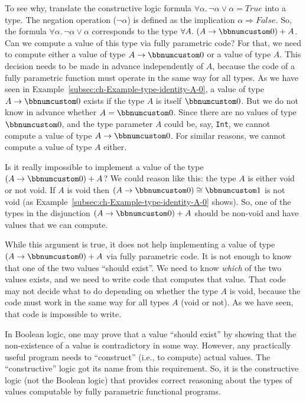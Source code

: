 To see why, translate the constructive logic formula $\forall\alpha.\,\neg\alpha\vee\alpha=True$
into a type. The negation operation ($\neg\alpha$) is defined as
the implication $\alpha\Rightarrow False$. So, the formula $\forall\alpha.\,\neg\alpha\vee\alpha$
corresponds to the type $\forall A.\,\left(A\rightarrow\bbnum 0\right)+A$.
Can we compute a value of this type via fully parametric code? For
that, we need to compute either a value of type $A\rightarrow\bbnum 0$
or a value of type $A$. This decision needs to be made in advance
independently of $A$, because the code of a fully parametric function
must operate in the same way for all types. As we have seen in Example~\ref{subsec:ch-Example-type-identity-A-0},
a value of type $A\rightarrow\bbnum 0$ exists if the type $A$ is
itself $\bbnum 0$. But we do not know in advance whether $A=\bbnum 0$.
Since there are no values of type $\bbnum 0$, and the type parameter
$A$ could be, say, \lstinline!Int!, we cannot compute a value of
type $A\rightarrow\bbnum 0$. For similar reasons, we cannot compute
a value of type $A$ either.

Is it really impossible to implement a value of the type $\left(A\rightarrow\bbnum 0\right)+A$?
We could reason like this: the type $A$ is either void or not void.
If $A$ is void then $\left(A\rightarrow\bbnum 0\right)\cong\bbnum 1$
is not void (as Example~\ref{subsec:ch-Example-type-identity-A-0}
shows). So, one of the types in the disjunction $\left(A\rightarrow\bbnum 0\right)+A$
should be non-void and have values that we can compute.

While this argument is true, it does not help implementing a value
of type $\left(A\rightarrow\bbnum 0\right)+A$ via fully parametric
code. It is not enough to know that one of the two values \textsf{``}should
exist\textsf{''}. We need to know \emph{which} of the two values exists, and
we need to write code that computes that value. That code may not
decide what to do depending on whether the type $A$ is void, because
the code must work in the same way for all types $A$ (void or not).
As we have seen, that code is impossible to write.

In Boolean logic, one may prove that a value \textsf{``}should exist\textsf{''} by
showing that the non-existence of a value is contradictory in some
way. However, any practically useful program needs to \textsf{``}construct\textsf{''}
(i.e., to compute) actual values. The \textsf{``}constructive\textsf{''}
logic got its name from this requirement. So, it is the constructive
logic (not the Boolean logic) that provides correct reasoning about
the types of values computable by fully parametric functional programs.

